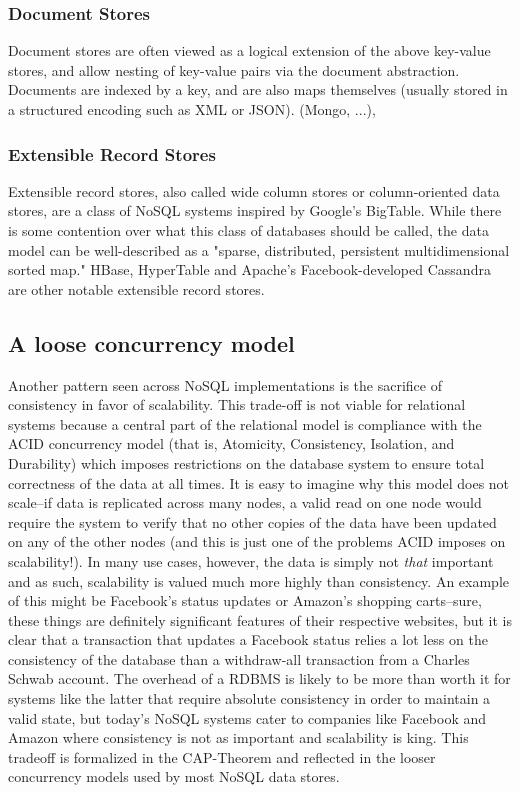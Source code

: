 \documentclass[11pt,a4paper]{report}
\begin{document}
 
\subsubsection{Document Stores}
Document stores are often viewed as a logical extension of the above key-value stores, and allow nesting of key-value pairs via the document abstraction. Documents are indexed by a key, and are also maps themselves (usually stored in a structured encoding such as XML or JSON). (Mongo, ...),


 
\subsubsection{Extensible Record Stores}
Extensible record stores, also called wide column stores or column-oriented data stores, are a class of NoSQL systems inspired by Google's BigTable. While there is some contention over what this class of databases should be called, the data model can be well-described as a "sparse, distributed, persistent multidimensional sorted map."\cite{chang2008bigtable} HBase, HyperTable and Apache's Facebook-developed Cassandra are other notable extensible record stores.


\subsection{A loose concurrency model}
Another pattern seen across NoSQL implementations is the sacrifice of consistency in favor of scalability. This trade-off is not viable for relational systems because a central part of the relational model is compliance with the ACID concurrency model (that is, Atomicity, Consistency, Isolation, and Durability) which imposes restrictions on the database system to ensure total correctness of the data at all times. It is easy to imagine why this model does not scale--if data is replicated across many nodes, a valid read on one node would require the system to verify that no other copies of the data have been updated on any of the other nodes (and this is just one of the problems ACID imposes on scalability!).  In many use cases, however, the data is simply not \textit{that} important and as such, scalability is valued much more highly than consistency. An example of this might be Facebook's status updates or Amazon's shopping carts--sure, these things are definitely significant features of their respective websites, but it is clear that a transaction that updates a Facebook status relies a lot less on the consistency of the database than a withdraw-all transaction from a Charles Schwab account. The overhead of a RDBMS is likely to be more than worth it for systems like the latter that require absolute consistency in order to maintain a valid state, but today's NoSQL systems cater to companies like Facebook and Amazon where consistency is not as important and scalability is king. This tradeoff is formalized in the CAP-Theorem and reflected in the looser concurrency models used by most NoSQL data stores.
\end{document}
